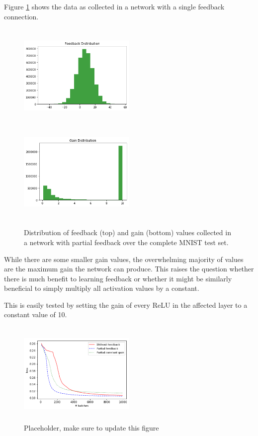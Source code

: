 \documentclass{article}
\begin{document}
 Figure \ref{fig:partialhists} shows the data as collected in a network with a single feedback connection. 
 
 \begin{figure}
      \centering
      \includegraphics[width=0.5\textwidth,height=5cm,keepaspectratio]{img/constgainpartial.png}
      \includegraphics[width=0.5\textwidth,height=5cm,keepaspectratio]{img/constgainpartialgain.png}

      \caption{Distribution of feedback (top) and gain (bottom) values collected in a network with partial feedback over the complete MNIST test set. }
      \label{fig:partialhists}
  \end{figure}
  
  While there are some smaller gain values, the overwhelming majority of values are the maximum gain the network can produce. This raises the question whether there is much benefit to learning feedback or whether it might be similarly beneficial to simply multiply all activation values by a constant. 
  
  This is easily tested by setting the gain of every ReLU in the affected layer to a constant value of 10. 
  \begin{figure}
      \centering
      \includegraphics[width=0.5\textwidth,height=5cm,keepaspectratio]{img/constgainpartial_loss.png}
      \caption{Placeholder, make sure to update this figure}
      \label{fig:contgainpartialloss}
  \end{figure}
  
\end{document}
